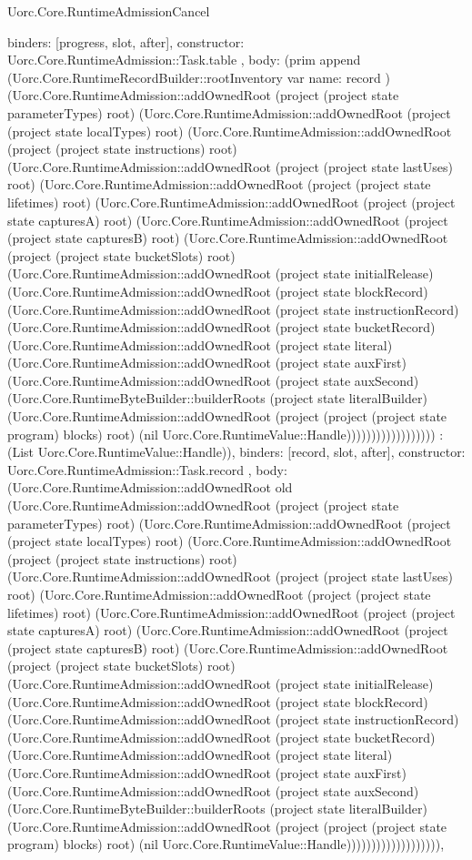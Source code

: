 \begin{lexlean}{Uorc.Core.RuntimeAdmissionCancel}
\begin{semanticmodule}
{{{        binders: [progress, slot, after],
        constructor: Uorc.Core.RuntimeAdmission::Task.table
      },
      {
        body: (prim append (Uorc.Core.RuntimeRecordBuilder::rootInventory var{
          name: record
        }) (Uorc.Core.RuntimeAdmission::addOwnedRoot (project (project state parameterTypes) root) (Uorc.Core.RuntimeAdmission::addOwnedRoot (project (project state localTypes) root) (Uorc.Core.RuntimeAdmission::addOwnedRoot (project (project state instructions) root) (Uorc.Core.RuntimeAdmission::addOwnedRoot (project (project state lastUses) root) (Uorc.Core.RuntimeAdmission::addOwnedRoot (project (project state lifetimes) root) (Uorc.Core.RuntimeAdmission::addOwnedRoot (project (project state capturesA) root) (Uorc.Core.RuntimeAdmission::addOwnedRoot (project (project state capturesB) root) (Uorc.Core.RuntimeAdmission::addOwnedRoot (project (project state bucketSlots) root) (Uorc.Core.RuntimeAdmission::addOwnedRoot (project state initialRelease) (Uorc.Core.RuntimeAdmission::addOwnedRoot (project state blockRecord) (Uorc.Core.RuntimeAdmission::addOwnedRoot (project state instructionRecord) (Uorc.Core.RuntimeAdmission::addOwnedRoot (project state bucketRecord) (Uorc.Core.RuntimeAdmission::addOwnedRoot (project state literal) (Uorc.Core.RuntimeAdmission::addOwnedRoot (project state auxFirst) (Uorc.Core.RuntimeAdmission::addOwnedRoot (project state auxSecond) (Uorc.Core.RuntimeByteBuilder::builderRoots (project state literalBuilder) (Uorc.Core.RuntimeAdmission::addOwnedRoot (project (project (project state program) blocks) root) (nil Uorc.Core.RuntimeValue::Handle)))))))))))))))))) : (List Uorc.Core.RuntimeValue::Handle)),
        binders: [record, slot, after],
        constructor: Uorc.Core.RuntimeAdmission::Task.record
      },
      {
        body: (Uorc.Core.RuntimeAdmission::addOwnedRoot old (Uorc.Core.RuntimeAdmission::addOwnedRoot (project (project state parameterTypes) root) (Uorc.Core.RuntimeAdmission::addOwnedRoot (project (project state localTypes) root) (Uorc.Core.RuntimeAdmission::addOwnedRoot (project (project state instructions) root) (Uorc.Core.RuntimeAdmission::addOwnedRoot (project (project state lastUses) root) (Uorc.Core.RuntimeAdmission::addOwnedRoot (project (project state lifetimes) root) (Uorc.Core.RuntimeAdmission::addOwnedRoot (project (project state capturesA) root) (Uorc.Core.RuntimeAdmission::addOwnedRoot (project (project state capturesB) root) (Uorc.Core.RuntimeAdmission::addOwnedRoot (project (project state bucketSlots) root) (Uorc.Core.RuntimeAdmission::addOwnedRoot (project state initialRelease) (Uorc.Core.RuntimeAdmission::addOwnedRoot (project state blockRecord) (Uorc.Core.RuntimeAdmission::addOwnedRoot (project state instructionRecord) (Uorc.Core.RuntimeAdmission::addOwnedRoot (project state bucketRecord) (Uorc.Core.RuntimeAdmission::addOwnedRoot (project state literal) (Uorc.Core.RuntimeAdmission::addOwnedRoot (project state auxFirst) (Uorc.Core.RuntimeAdmission::addOwnedRoot (project state auxSecond) (Uorc.Core.RuntimeByteBuilder::builderRoots (project state literalBuilder) (Uorc.Core.RuntimeAdmission::addOwnedRoot (project (project (project state program) blocks) root) (nil Uorc.Core.RuntimeValue::Handle))))))))))))))))))),
}}}
\end{semanticmodule}
\end{lexlean}
